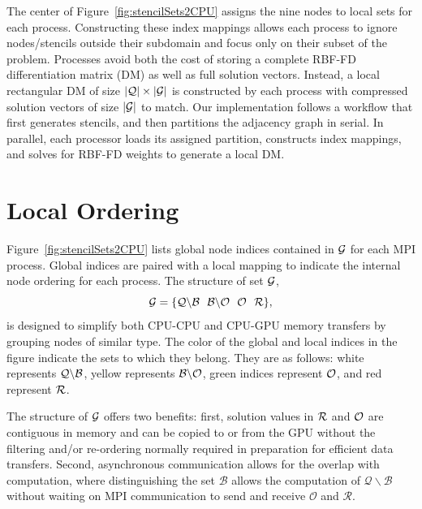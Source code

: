 \documentclass{report}
\begin{document}
The center of Figure~\ref{fig:stencilSets2CPU} assigns the nine nodes to local sets for each process. Constructing these index mappings allows each process to ignore nodes/stencils outside their subdomain and focus only on their subset of the problem. Processes avoid both the cost of storing a complete RBF-FD differentiation matrix (DM) as well as full solution vectors. Instead, a local rectangular DM of size $|\mathcal{Q}| \times |\mathcal{G}|$ is constructed by each process with compressed solution vectors of size $|\mathcal{G}|$ to match. Our implementation follows a workflow that first generates stencils, and then partitions the adjacency graph in serial. In parallel, each processor loads its assigned partition, constructs index mappings, and solves for RBF-FD weights to generate a local DM.  

\section{Local Ordering}

Figure~\ref{fig:stencilSets2CPU} lists global node indices contained in $\mathcal{G}$ for each MPI process. Global indices are paired with a local mapping to indicate the internal node ordering for each process. The structure of set $\mathcal{G}$,
   \begin{equation}
 		\setAllNodes = \{ \mathcal{Q}\backslash\mathcal{B} \ \ \mathcal{B}\backslash\mathcal{O} \ \ \mathcal{O} \ \ \setDepend \},
            \label{eq:decompose_g}
        \end{equation}
 is designed to simplify both CPU-CPU and CPU-GPU memory transfers by grouping nodes of similar type. The color of the global and local indices in the figure
 indicate the sets to which they belong. They are as follows: white represents $\mathcal{Q} \backslash \mathcal{B}$, 
 yellow represents $\mathcal{B} \backslash \mathcal{O}$, green indices 
 represent $\mathcal{O}$, and red represent $\mathcal{R}$.  


 The structure of $\mathcal{G}$ offers two benefits: first, solution values in $\mathcal{R}$ and $\mathcal{O}$ are contiguous in memory and can be copied to or from the GPU without the filtering and/or re-ordering normally required in preparation for efficient data transfers. Second, asynchronous communication allows for the overlap with computation, where distinguishing the set $\mathcal{B}$ allows the computation of $\mathcal{Q}\backslash \mathcal{B}$ without waiting on MPI communication to send and receive $\mathcal{O}$ and $\mathcal{R}$. 
\end{document}
